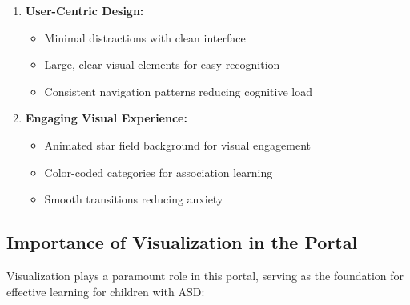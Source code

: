 \documentclass[12pt,a4paper]{article}
\begin{document}
\begin{enumerate}[leftmargin=*]
    \item \textbf{User-Centric Design:}
    \begin{itemize}
        \item Minimal distractions with clean interface
        \item Large, clear visual elements for easy recognition
        \item Consistent navigation patterns reducing cognitive load
    \end{itemize}
    
    \item \textbf{Engaging Visual Experience:}
    \begin{itemize}
        \item Animated star field background for visual engagement
        \item Color-coded categories for association learning
        \item Smooth transitions reducing anxiety
    \end{itemize}
\end{enumerate}

\subsection{Importance of Visualization in the Portal}

Visualization plays a paramount role in this portal, serving as the foundation for effective learning for children with ASD:
\end{document}

